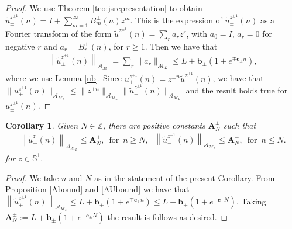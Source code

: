 \documentclass[12pt,oneside,onecolumn,open]{article}
\newtheorem{cor}[teo]{Corollary}
\begin{document}
\begin{proof}
We use Theorem \ref{teo:jsrepresentation} to obtain 
    $ 
        \tilde{u}_{\pm }^{z^{\pm 1}}(n)=I+\sum _{m=1}^{\infty }B_{m}^{\pm  }(n)z^{m}.  
    $ 
This is the expression of $ \tilde u_{\pm }^{z^{\pm 1}}(n) $ as a Fourier transform of the form $ \tilde u_{\pm }^{z^{\pm 1}}(n) = \sum _{r} {a_{r} z^{r}}$, with $a_{0} = I$, $ a_{r} = 0 $ for negative $r$ and $ a_r = B^{\pm}_r(n) $, for $r \geq 1$. Then we have that 
\begin{align}
    \left\|\tilde{u}^{z^{\pm 1}}_{\pm}(n)\right\|_{ \mathcal{A}_{\mathcal{M}_L} } = \sum_r \|a_r\|_{\mathcal{M}_L} \leq L+ \mathbf{b}_{\pm} (1 +  e^{ \mp \mathbf{c}_{\pm}  n}),    
    \end{align}
where we use Lemma \ref{ub}.   Since $ u_{\pm }^{z^{\pm 1}}(n) =  z^{\pm n} \tilde{u}_{\pm }^{z^{\pm 1}}(n)$, we have that 
 $ \| u_{\pm }^{z^{\pm 1}}(n) \|_{ \mathcal{A}_{\mathcal{M}_L} }\leq \|  z^{\pm n} \|_{ \mathcal{A}_{\mathcal{M}_L} }\| \tilde{u}_{\pm }^{z^{\pm 1}}(n)  \|_{ \mathcal{A}_{\mathcal{M}_L} }$
and the result holds true for $u_{\pm }^{z^{\pm 1}}(n).$
\end{proof}
\begin{cor}
    Given $ N \in \mathbb{Z} $, there are  positive constants $\mathbf{A}_N ^{\pm}$ such that
    \begin{align}\label{one}
\left\|\tilde{u}^{z}_{+}(n)\right\|_{ \mathcal{A}_{\mathcal{M}_L} } \leq \mathbf{A}_N ^{+}, \,\,\,
\text{for}\,\,\, n\geq N, \: \, \: \left\|\tilde{u}^{z^{-1}}_{-}(n)\right\|_{ \mathcal{A}_{\mathcal{M}_L} } \leq \mathbf{A}_N ^{-},\,\,\, \text{for}\,\,\, n\leq N . \end{align}
 for $z\in \mathbb{S}^{1}.$
    \end{cor}
    
\begin{proof}
    We take $ n  $ and $ N $ as in the statement of the present Corollary.  From Proposition \ref{Abound} and \eqref{AUbound} we have that 
    $
\left\|\tilde{u}^{z^{\pm 1}}_{\pm}(n)\right\|_{ \mathcal{A}_{\mathcal{M}_L} } \leq L+\mathbf{b}_{\pm }(1+e^{\mp \mathbf{c_\pm }n}) \leq  L+ \mathbf{b}_{\pm} (1 +  e^{ - \mathbf{c}_{\pm }  N}). 
$
 Taking $\textbf{A}^{\pm}_{N}:=L+ \mathbf{b}_{\pm} (1 +  e^{ - \mathbf{c}_{\pm }  N})$ the result is follows as desired.
\end{proof}
\color{black}
\end{document}
